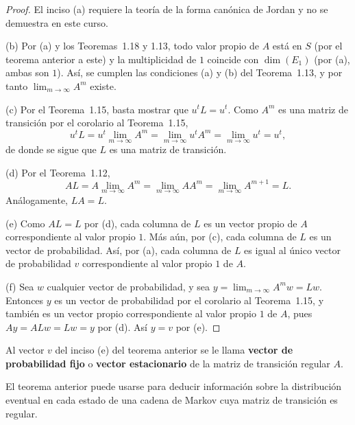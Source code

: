 \documentclass[12pt,a4paper]{book}
\begin{document}
    \begin{proof}
        El inciso (a) requiere la teoría de la forma canónica de Jordan y no se demuestra en este curso.

        (b) Por (a) y los Teoremas~1.18 y 1.13, todo valor propio de $A$ está en $S$ (por el teorema anterior a este) y la multiplicidad de $1$ coincide con $\dim(E_1)$ (por (a), ambas son $1$). Así, se cumplen las condiciones (a) y (b) del Teorema~1.13, y por tanto $\lim_{m\to\infty}A^m$ existe.

        (c) Por el Teorema~1.15, basta mostrar que $u^tL=u^t$. Como $A^m$ es una matriz de transición por el corolario al Teorema~1.15,
        \begin{equation*}
            u^tL=u^t\lim_{m\to\infty}A^m=\lim_{m\to\infty}u^tA^m=\lim_{m\to\infty}u^t=u^t,
        \end{equation*}
        de donde se sigue que $L$ es una matriz de transición.

        (d) Por el Teorema~1.12,
        \begin{equation*}
            AL=A\lim_{m\to\infty}A^m=\lim_{m\to\infty}AA^m=\lim_{m\to\infty}A^{m+1}=L.
        \end{equation*}
        Análogamente, $LA=L$.

        (e) Como $AL=L$ por (d), cada columna de $L$ es un vector propio de $A$ correspondiente al valor propio $1$. Más aún, por (c), cada columna de $L$ es un vector de probabilidad. Así, por (a), cada columna de $L$ es igual al único vector de probabilidad $v$ correspondiente al valor propio $1$ de $A$.

        (f) Sea $w$ cualquier vector de probabilidad, y sea $y=\lim_{m\to\infty}A^mw=Lw$. Entonces $y$ es un vector de probabilidad por el corolario al Teorema~1.15, y también es un vector propio correspondiente al valor propio $1$ de $A$, pues $Ay=ALw=Lw=y$ por (d). Así $y=v$ por (e).
    \end{proof}

    \begin{definicion}
        Al vector $v$ del inciso (e) del teorema anterior se le llama \textbf{vector de probabilidad fijo} o \textbf{vector estacionario} de la matriz de transición regular $A$.
    \end{definicion}

    El teorema anterior puede usarse para deducir información sobre la distribución eventual en cada estado de una cadena de Markov cuya matriz de transición es regular.
\end{document}
